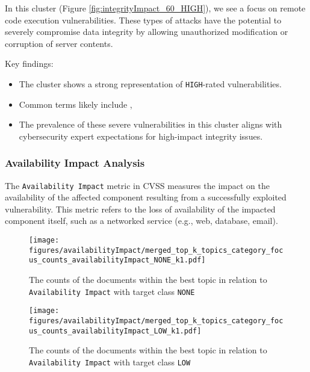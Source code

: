 In this cluster (Figure \ref{fig:integrityImpact_60_HIGH}), we see a focus on remote code execution vulnerabilities. These types of attacks have the potential to severely compromise data integrity by allowing unauthorized modification or corruption of server contents.

Key findings:

\begin{itemize}
	\item The cluster shows a strong representation of \texttt{HIGH}-rated vulnerabilities.
	\item Common terms likely include , 
	\item The prevalence of these severe vulnerabilities in this cluster aligns with cybersecurity expert expectations for high-impact integrity issues.
\end{itemize}

\subsubsection{Availability Impact Analysis}

The \texttt{Availability Impact} metric in CVSS measures the impact on the availability of the affected component resulting from a successfully exploited vulnerability. This metric refers to the loss of availability of the impacted component itself, such as a networked service (e.g., web, database, email).

\begin{figure}[t]
	\begin{center}
		\texttt{[image: figures/availabilityImpact/merged\_top\_k\_topics\_category\_focus\_counts\_availabilityImpact\_NONE\_k1.pdf]}
	\end{center}
	\caption{The counts of the documents within the best topic in relation to \texttt{Availability Impact} with target class \texttt{NONE}}
	\label{fig:availabilityImpact_60_NONE}
\end{figure}

\begin{figure}[t]
	\begin{center}
		\texttt{[image: figures/availabilityImpact/merged\_top\_k\_topics\_category\_focus\_counts\_availabilityImpact\_LOW\_k1.pdf]}
	\end{center}
	\caption{The counts of the documents within the best topic in relation to \texttt{Availability Impact} with target class \texttt{LOW}}
	\label{fig:availabilityImpact_60_LOW}
\end{figure}

